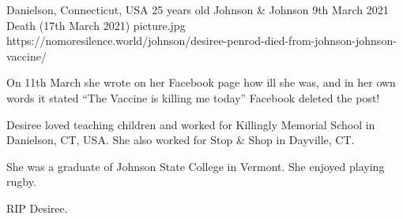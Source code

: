{Danielson, Connecticut, USA}
{25 years old}
{Johnson \& Johnson}
{9th March 2021}
{Death (17th March 2021)}
{picture.jpg}
{https://nomoresilence.world/johnson/desiree-penrod-died-from-johnson-johnson-vaccine/}
{

On 11th March she wrote on her Facebook page how ill she was, and in her own
words it stated “The Vaccine is killing me today” Facebook deleted the post!

Desiree loved teaching children and worked for Killingly Memorial School in
Danielson, CT, USA. She also worked for Stop \& Shop in Dayville, CT.

She was a graduate of Johnson State College in Vermont. She enjoyed playing
rugby.

RIP Desiree.

}
